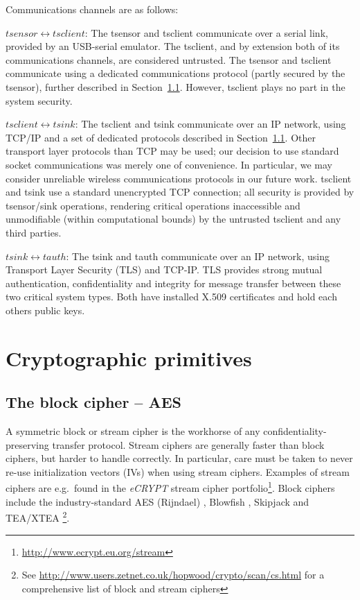 Communications channels are as follows:
%
\begin{description}
\item {$tsensor \longleftrightarrow tsclient$:}
The tsensor and tsclient communicate over a serial link, provided by an USB-serial emulator. The tsclient, and by extension both of its communications channels, are considered untrusted. The tsensor and tsclient communicate using a dedicated communications protocol (partly secured by the tsensor), further described in Section~\ref{}. However, tsclient plays no part in the system security.

\item {$tsclient \longleftrightarrow tsink$:}
The tsclient and tsink communicate over an IP network, using TCP/IP and a set of dedicated protocols described in Section~\ref{}. Other transport layer protocols than TCP may be used; our decision to use standard socket communications was merely one of convenience. In particular, we may consider unreliable wireless communications protocols in our future work. tsclient and tsink use a standard unencrypted TCP connection; all security is provided by tsensor/sink operations, rendering critical operations inaccessible and unmodifiable (within computational bounds) by the untrusted tsclient and any third parties.

\item {$tsink \longleftrightarrow tauth$:}
The tsink and tauth communicate over an IP network, using Transport Layer Security (TLS) \cite{} and TCP-IP. TLS provides strong mutual authentication, confidentiality and integrity for message transfer between these two critical system types. Both have installed X.509 certificates and hold each others public keys.

\end{description}

\section{Cryptographic primitives}

\subsection{The block cipher -- AES}

A symmetric block or stream cipher is the workhorse of any confidentiality-preserving transfer protocol. 
%
Stream ciphers are generally faster than block ciphers, but harder to handle correctly. In particular, care must be taken to never re-use initialization vectors (IVs) when using stream ciphers. Examples of stream ciphers are e.g.\ found in the \textit{eCRYPT} stream cipher portfolio\footnote{\url{http://www.ecrypt.eu.org/stream}}. 
%
Block ciphers include the industry-standard AES (Rijndael) , Blowfish , Skipjack  and TEA/XTEA \footnote{See  \url{http://www.users.zetnet.co.uk/hopwood/crypto/scan/cs.html} for a comprehensive list of block and stream ciphers}.

